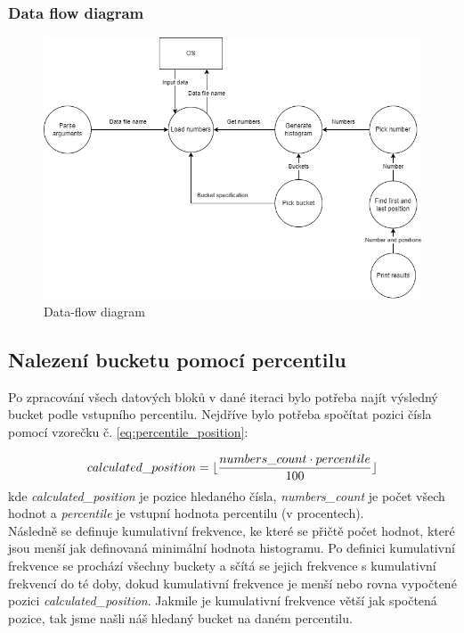 \documentclass[12pt, a4paper]{article}
\newcommand{\floor}[1]{\lfloor #1 \rfloor}
\begin{document}
\subsubsection{Data flow diagram}
\begin{figure}[!h]
\centering
\includegraphics[width=14cm]{img/data_flow}
\caption{Data-flow diagram}
\label{fig:dataflow}
\end{figure}
\newpage

\subsection{Nalezení bucketu pomocí percentilu}\label{ssec:bucket_find}
Po zpracování všech datových bloků v dané iteraci bylo potřeba najít výsledný bucket podle vstupního percentilu. Nejdříve bylo potřeba spočítat pozici čísla pomocí vzorečku č. \ref{eq:percentile_position}:

\begin{equation}
calculated\_position =  \floor{\frac{numbers\_count \cdot percentile}{100}}\\
\label{eq:percentile_position} 
\end{equation}
kde \textit{calculated\_position} je pozice hledaného čísla, \textit{numbers\_count} je počet všech hodnot a \textit{percentile} je vstupní hodnota percentilu (v procentech).\\

\indent Následně se definuje kumulativní frekvence, ke které se přičtě počet hodnot, které jsou menší jak definovaná minimální hodnota histogramu. Po definici kumulativní frekvence se prochází všechny buckety a sčítá se jejich frekvence s kumulativní frekvencí do té doby, dokud kumulativní frekvence je menší nebo rovna vypočtené pozici \textit{calculated\_position}. Jakmile je kumulativní frekvence větší jak spočtená pozice, tak jsme našli náš hledaný bucket na daném percentilu.
\end{document}
